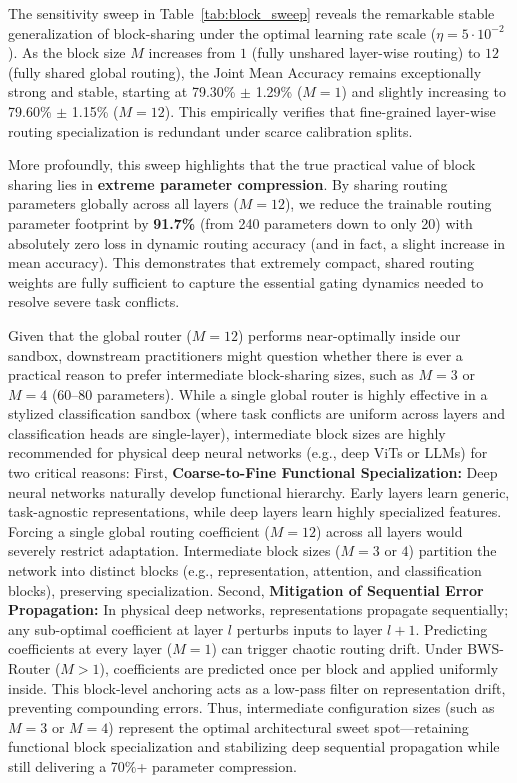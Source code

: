 The sensitivity sweep in Table~\ref{tab:block_sweep} reveals the remarkable stable generalization of block-sharing under the optimal learning rate scale ($\eta = 5 \cdot 10^{-2}$). As the block size $M$ increases from $1$ (fully unshared layer-wise routing) to $12$ (fully shared global routing), the Joint Mean Accuracy remains exceptionally strong and stable, starting at 79.30\% $\pm$ 1.29\% ($M=1$) and slightly increasing to 79.60\% $\pm$ 1.15\% ($M=12$). This empirically verifies that fine-grained layer-wise routing specialization is redundant under scarce calibration splits.

More profoundly, this sweep highlights that the true practical value of block sharing lies in \textbf{extreme parameter compression}. By sharing routing parameters globally across all layers ($M=12$), we reduce the trainable routing parameter footprint by \textbf{91.7\%} (from 240 parameters down to only 20) with absolutely zero loss in dynamic routing accuracy (and in fact, a slight increase in mean accuracy). This demonstrates that extremely compact, shared routing weights are fully sufficient to capture the essential gating dynamics needed to resolve severe task conflicts.

Given that the global router ($M=12$) performs near-optimally inside our sandbox, downstream practitioners might question whether there is ever a practical reason to prefer intermediate block-sharing sizes, such as $M=3$ or $M=4$ (60--80 parameters). While a single global router is highly effective in a stylized classification sandbox (where task conflicts are uniform across layers and classification heads are single-layer), intermediate block sizes are highly recommended for physical deep neural networks (e.g., deep ViTs or LLMs) for two critical reasons:
First, \textbf{Coarse-to-Fine Functional Specialization:} Deep neural networks naturally develop functional hierarchy. Early layers learn generic, task-agnostic representations, while deep layers learn highly specialized features. Forcing a single global routing coefficient ($M=12$) across all layers would severely restrict adaptation. Intermediate block sizes ($M=3$ or $4$) partition the network into distinct blocks (e.g., representation, attention, and classification blocks), preserving specialization.
Second, \textbf{Mitigation of Sequential Error Propagation:} In physical deep networks, representations propagate sequentially; any sub-optimal coefficient at layer $l$ perturbs inputs to layer $l+1$. Predicting coefficients at every layer ($M=1$) can trigger chaotic routing drift. Under BWS-Router ($M > 1$), coefficients are predicted once per block and applied uniformly inside. This block-level anchoring acts as a low-pass filter on representation drift, preventing compounding errors.
Thus, intermediate configuration sizes (such as $M=3$ or $M=4$) represent the optimal architectural sweet spot---retaining functional block specialization and stabilizing deep sequential propagation while still delivering a 70\%+ parameter compression.

